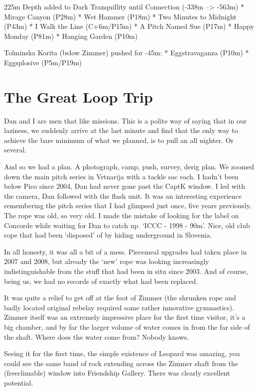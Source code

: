 225m Depth added to Dark Tranquillity until Connection (-338m
--\textgreater{} -563m) * Mirage Canyon (P28m) * Wet Hammer (P18m) * Two
Minutes to Midnight (P43m) * I Walk the Line (C+6m/P15m) * A Pitch Named
Sue (P17m) * Happy Monday (P81m) * Hanging Garden (P10m)

Tolminska Korita (below Zimmer) pushed for -45m: * Eggstravaganza (P10m)
* Eggsplosive (P5m/P19m)

\section{The Great Loop Trip}\label{the-great-loop-trip}

Dan and I are men that like missions. This is a polite way of saying
that in our laziness, we suddenly arrive at the last minute and find
that the only way to achieve the bare minimum of what we planned, is to
pull an all nighter. Or several.

And so we had a plan. A photograph, camp, push, survey, derig plan. We
zoomed down the main pitch series in Vrtnarija with a tackle sac each. I
hadn't been below Pico since 2004, Dan had never gone past the CaptK
window. I led with the camera, Dan followed with the flash unit. It was
an interesting experience remembering the pitch series that I had
glimpsed just once, five years previously. The rope was old, so very
old. I made the mistake of looking for the label on Concorde while
waiting for Dan to catch up. `ICCC - 1998 - 90m'. Nice, old club rope
that had been `disposed' of by hiding underground in Slovenia.

In all honesty, it was all a bit of a mess. Piecemeal upgrades had taken
place in 2007 and 2008, but already the `new' rope was looking
increasingly indistinguishable from the stuff that had been in situ
since 2003. And of course, being us, we had no records of exactly what
had been replaced.

It was quite a relief to get off at the foot of Zimmer (the shrunken
rope and badly located original rebelay required some rather innovative
gymnastics). Zimmer itself was an extremely impressive place for the
first time visitor, it's a big chamber, and by far the larger volume of
water comes in from the far side of the shaft. Where does the water come
from? Nobody knows.

Seeing it for the first time, the simple existence of Leopard was
amazing, you could see the same band of rock extending across the Zimmer
shaft from the (freeclimable) window into Friendship Gallery. There was
clearly excellent potential.

